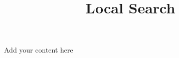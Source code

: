 \title{Local Search}
\label{chp:local-search}
\author{}
\institute{}
\maketitle


Add your content here




